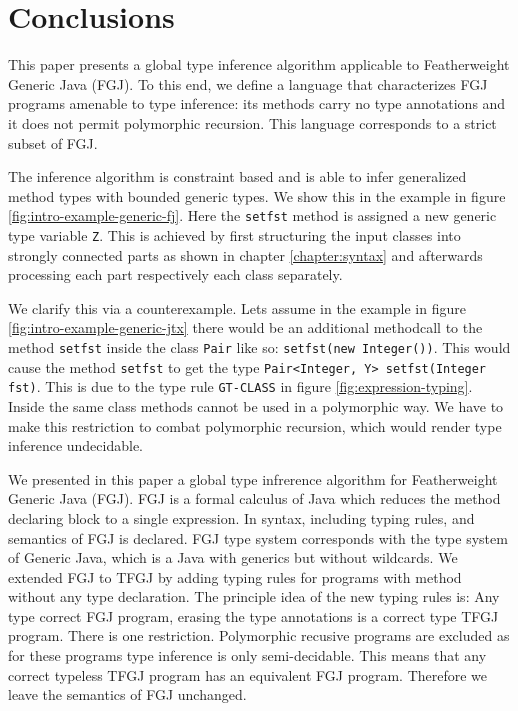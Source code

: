 \section{Conclusions}
\label{sec:conclusions}

This paper presents a global type inference algorithm applicable to
Featherweight Generic Java (FGJ). To this end, we define a language
\FGJGT that characterizes FGJ programs amenable to type inference: its
methods carry no type annotations and it does not permit polymorphic recursion.
This language corresponds to a strict subset of FGJ.

The inference algorithm is constraint based and is able to infer
generalized method types with bounded generic types. 
We show this in the example in figure \ref{fig:intro-example-generic-fj}.
Here the \texttt{setfst} method is assigned a new generic type variable \texttt{Z}.
This is achieved by first structuring the input classes into strongly connected parts as shown in chapter \ref{chapter:syntax}
and afterwards processing each part respectively each class separately.

We clarify this via a counterexample.
Lets assume in the example in figure \ref{fig:intro-example-generic-jtx} there would be an additional methodcall to the method \texttt{setfst} inside the class \texttt{Pair} like so:
\texttt{setfst(new Integer())}.
This would cause the method \texttt{setfst} to get the type \texttt{Pair<Integer, Y> setfst(Integer fst)}.
This is due to the type rule \texttt{GT-CLASS} in figure \ref{fig:expression-typing}.
Inside the same class methods cannot be used in a polymorphic way.
We have to make this restriction to combat polymorphic recursion, which would render type inference undecidable.


We presented in this paper a global type infrerence algorithm for Featherweight
Generic Java (FGJ). FGJ is a formal calculus of Java which reduces the method
declaring block to a single expression. In
\cite{DBLP:journals/toplas/IgarashiPW01} syntax, including typing rules, and semantics of FGJ is
declared. FGJ type system corresponds with the type system of Generic Java, which is a Java with generics but without wildcards. We extended FGJ to TFGJ by adding typing rules for
programs with method without any type declaration. The principle idea of the
new typing rules is: Any type correct FGJ program, erasing the type
annotations is a correct type TFGJ program. There is one
restriction. Polymorphic recusive programs are excluded as for these programs
type inference is only semi-decidable. This means that any correct typeless TFGJ program
has an equivalent FGJ program. Therefore we leave the semantics of FGJ unchanged.

